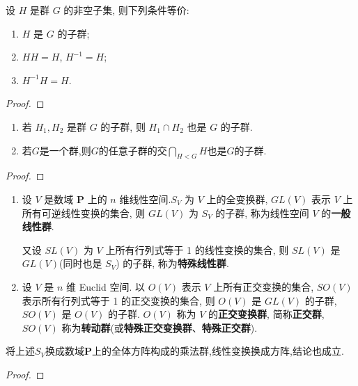 \documentclass[../../main.tex]{subfiles}
\begin{document}
\begin{corollary}
设 \( H \) 是群 \( G \) 的非空子集, 则下列条件等价:
\begin{enumerate}[(1)]
\item \( H \) 是 \( G \) 的子群;

\item \( HH = H \), \( H^{-1} = H \);

\item \( H^{-1}H = H \).
\end{enumerate}
\end{corollary}
\begin{proof}

\end{proof}

\begin{corollary}
\begin{enumerate}
\item 若 \( H_1, H_2 \) 是群 \( G \) 的子群, 则 \( H_1 \cap H_2 \) 也是 \( G \) 的子群.

\item 若$G$是一个群,则$G$的任意子群的交$\bigcap_{H<G}{H}$也是$G$的子群.
\end{enumerate}
\end{corollary}
\begin{proof}

\end{proof}

\begin{example}
\begin{enumerate}
\item 设 \( V \) 是数域 \( \mathbf{P} \) 上的 \( n \) 维线性空间.\( S_V \) 为 \( V \) 上的全变换群, \( GL(V) \) 表示 \( V \) 上所有可逆线性变换的集合, 则 \( GL(V) \) 为 \( S_V \) 的子群, 称为线性空间 \( V \) 的\textbf{一般线性群}. 

又设 \( SL(V) \) 为 \( V \) 上所有行列式等于 1 的线性变换的集合, 则 \( SL(V) \) 是 \( GL(V) \)(同时也是 \( S_V \)) 的子群, 称为\textbf{特殊线性群}.

\item 设 \( V \) 是 \( n \) 维 Euclid 空间. 以 \( O(V) \) 表示 \( V \) 上所有正交变换的集合, \( SO(V) \) 表示所有行列式等于 1 的正交变换的集合, 则 \( O(V) \) 是 \( GL(V) \) 的子群, \( SO(V) \) 是 \( O(V) \) 的子群. \( O(V) \) 称为 \( V \) 的\textbf{正交变换群}, 简称\textbf{正交群}, \( SO(V) \) 称为\textbf{转动群}(或\textbf{特殊正交变换群}、\textbf{特殊正交群}).
\end{enumerate}
\end{example}
\begin{remark}
将上述$S_V$换成数域$\mathbf{P}$上的全体方阵构成的乘法群,线性变换换成方阵,结论也成立.
\end{remark}
\begin{proof}

\end{proof}
\end{document}
